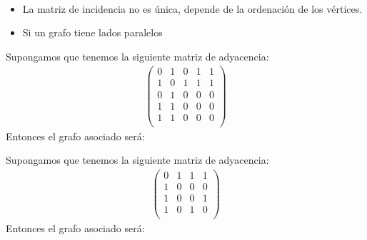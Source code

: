 \begin{propiedades}\
    \begin{itemize}
        \item La matriz de incidencia no es única, depende de la ordenación de los vértices.
        \item Si un grafo tiene lados paralelos %
    \end{itemize}
\end{propiedades}

\begin{ejemplo}
    Supongamos que tenemos la siguiente matriz de adyacencia:
    \begin{align*}
        \begin{pmatrix}
            0 & 1 & 0 & 1 & 1\\
            1 & 0 & 1 & 1 & 1\\
            0 & 1 & 0 & 0 & 0\\
            1 & 1 & 0 & 0 & 0\\
            1 & 1 & 0 & 0 & 0\\
        \end{pmatrix}
    \end{align*}
    Entonces el grafo asociado será: 

\end{ejemplo}

\begin{ejemplo}
    Supongamos que tenemos la siguiente matriz de adyacencia:
    \begin{align*}
        \begin{pmatrix}
            0 & 1 & 1 & 1 \\
            1 & 0 & 0 & 0 \\
            1 & 0 & 0 & 1 \\
            1 & 0 & 1 & 0 \\
        \end{pmatrix}
    \end{align*}
    Entonces el grafo asociado será: 
    \begin{center}
    \end{center}

\end{ejemplo}

